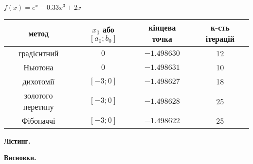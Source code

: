 \documentclass{extreport}
\begin{document}
\begin{center}
    $f(x) = e^x - 0.33x^3 + 2x$

    
    \vspace{0.5em}

    \begin{tabular}{|c|c|c|c|}
    \hline
                    \bf метод & $x_0$ або $[a_0; b_0]$ &  \bf кінцева точка &  \bf к-сть ітерацій \\
                    \hline
              градієнтний &                    $0$ &    $-1.498630$ &                   12 \\
              \hline
                  Ньютона &                    $0$ &    $-1.498631$ &                  10 \\
                  \hline
                дихотомії &              $[-3; 0]$ &    $-1.498627$ &                  18 \\
                \hline
        золотого перетину &              $[-3; 0]$ &    $-1.498628$ &                  25 \\
        \hline
                Фібоначчі &              $[-3; 0]$ &    $-1.498622$ &                  25 \\
                \hline
    \end{tabular}
\end{center}

\noindent\textbf{Лістинг.}

%

%

\noindent\textbf{Висновки.}
\end{document}
